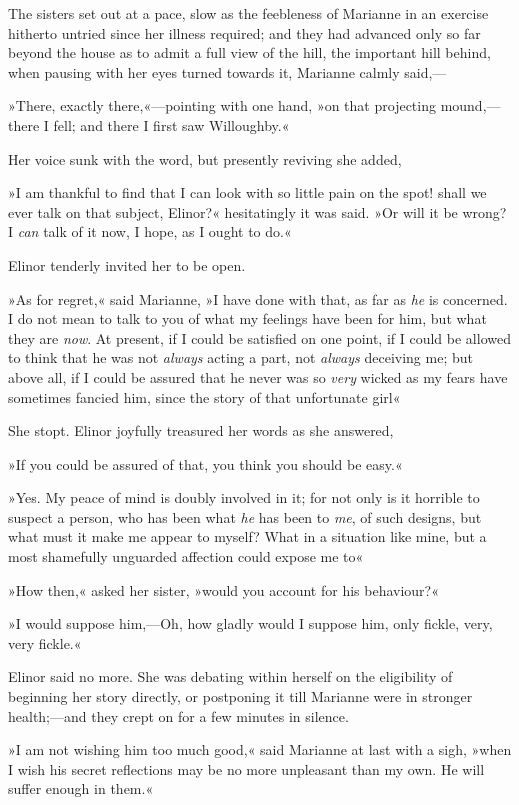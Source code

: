 The sisters set out at a pace, slow as the feebleness of Marianne in an exercise hitherto untried since her illness required; and they had advanced only so far beyond the house as to admit a full view of the hill, the important hill behind, when pausing with her eyes turned towards it, Marianne calmly said,—

»There, exactly there,«—pointing with one hand, »on that projecting mound,—there I fell; and there I first saw Willoughby.«

Her voice sunk with the word, but presently reviving she added,

»I am thankful to find that I can look with so little pain on the spot! shall we ever talk on that subject, Elinor?« hesitatingly it was said. »Or will it be wrong? I \textit{can} talk of it now, I hope, as I ought to do.«

Elinor tenderly invited her to be open.

»As for regret,« said Marianne, »I have done with that, as far as \textit{he} is concerned. I do not mean to talk to you of what my feelings have been for him, but what they are \textit{now}. At present, if I could be satisfied on one point, if I could be allowed to think that he was not \textit{always} acting a part, not \textit{always} deceiving me; but above all, if I could be assured that he never was so \textit{very} wicked as my fears have sometimes fancied him, since the story of that unfortunate girl\longdash«

She stopt. Elinor joyfully treasured her words as she answered,

»If you could be assured of that, you think you should be easy.«

»Yes. My peace of mind is doubly involved in it; for not only is it horrible to suspect a person, who has been what \textit{he} has been to \textit{me}, of such designs, but what must it make me appear to myself? What in a situation like mine, but a most shamefully unguarded affection could expose me to\longdash«

»How then,« asked her sister, »would you account for his behaviour?«

»I would suppose him,—Oh, how gladly would I suppose him, only fickle, very, very fickle.«

Elinor said no more. She was debating within herself on the eligibility of beginning her story directly, or postponing it till Marianne were in stronger health;—and they crept on for a few minutes in silence.

»I am not wishing him too much good,« said Marianne at last with a sigh, »when I wish his secret reflections may be no more unpleasant than my own. He will suffer enough in them.«


